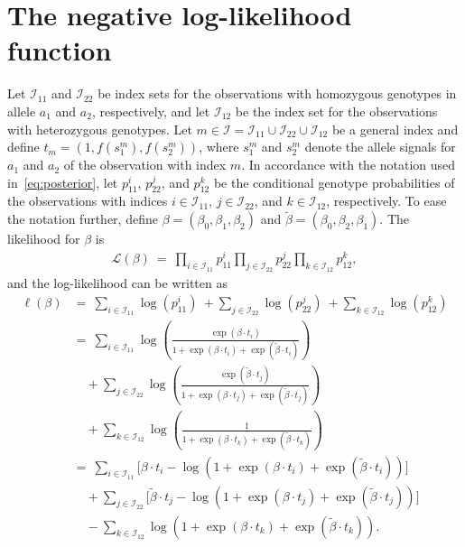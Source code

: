 \documentclass[preprint,5p,times,11pt]{elsarticle}
\begin{document}
\section*{The negative log-likelihood function}
Let $\mathcal{I}_{11}$ and $\mathcal{I}_{22}$ be index sets for the observations with homozygous genotypes in allele $a_1$ and $a_2$, respectively, and let $\mathcal{I}_{12}$ be the index set for the observations with heterozygous genotypes.
Let $m \in \mathcal{I} = \mathcal{I}_{11}\cup\mathcal{I}_{22}\cup\mathcal{I}_{12}$ be a general index and define $t_m = (1, f(s_1^m), f(s_2^m))$, where $s_1^m$ and $s_2^m$ denote the allele signals for $a_1$ and $a_2$ of the observation with index $m$.
In accordance with the notation used in~\eqref{eq:posterior}, let $p_{11}^i$, $p_{22}^j$, and $p_{12}^k$ be the conditional genotype probabilities of the observations with indices $i \in \mathcal{I}_{11}$, $j \in \mathcal{I}_{22}$, and $k \in \mathcal{I}_{12}$, respectively.
To ease the notation further, define $\beta = (\beta_0,\beta_1,\beta_2)$ and $\tilde\beta = (\beta_0,\beta_2,\beta_1)$.
The likelihood for $\beta$ is
\begin{align*}
\mathcal{L}\left(\beta\right) \ = \ \prod_{i\in\mathcal{I}_{11}} p_{11}^i \prod_{j\in\mathcal{I}_{22}} p_{22}^j \prod_{k\in\mathcal{I}_{12}} p_{12}^k,
\end{align*}
and the log-likelihood can be written as
\begin{align*}
\ell\left(\beta\right)
&=\ \sum_{i\in\mathcal{I}_{11}} \log\left(p_{11}^i\right)
\ + \sum_{j\in\mathcal{I}_{22}} \log\left(p_{22}^j\right)
\ + \sum_{k\in\mathcal{I}_{12}} \log\left(p_{12}^k\right) \\
&= \ \sum_{i\in\mathcal{I}_{11}} \log\left(\frac{\exp\left(\beta \cdot t_i \right)}{1 + \exp\left(\beta \cdot t_i \right) + \exp\left(\tilde{\beta} \cdot t_i \right)}\right) \\
&\quad + \sum_{j\in\mathcal{I}_{22}} \log\left(\frac{\exp\left(\tilde{\beta} \cdot t_j \right)}{1 + \exp\left(\beta \cdot t_j \right) + \exp\left(\tilde{\beta} \cdot t_j \right)}\right) \\
&\quad + \sum_{k\in\mathcal{I}_{12}} \log\left(\frac{1}{1 + \exp\left(\beta \cdot t_k \right) + \exp\left(\tilde{\beta} \cdot t_k \right)}\right) \\
&= \ \sum_{i\in\mathcal{I}_{11}} \Bigg[ \beta \cdot t_i - \log\left(1 + \exp\left(\beta \cdot t_i \right) + \exp\left(\tilde{\beta} \cdot t_i \right)\right) \Bigg] \\
&\quad + \sum_{j\in\mathcal{I}_{22}} \Bigg[ \tilde{\beta} \cdot t_j - \log\left(1 + \exp\left(\beta \cdot t_j \right) + \exp\left(\tilde{\beta} \cdot t_j \right)\right) \Bigg] \\
&\quad - \sum_{k\in\mathcal{I}_{12}} \log\left(1 + \exp\left(\beta \cdot t_k \right) + \exp\left(\tilde{\beta} \cdot t_k \right)\right).
\end{align*}
\end{document}
